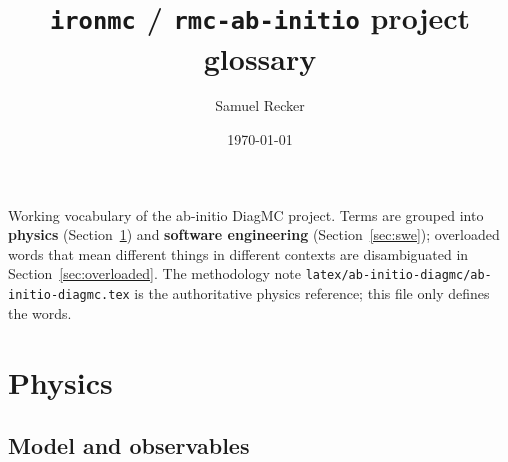 \documentclass[11pt]{article}
\title{\texttt{ironmc} / \texttt{rmc-ab-initio} project glossary}
\author{Samuel Recker}
\date{\today}
\begin{document}
\maketitle

\noindent
Working vocabulary of the ab-initio DiagMC project. Terms are grouped into
\textbf{physics} (Section~\ref{sec:physics}) and \textbf{software engineering}
(Section~\ref{sec:swe}); overloaded words that mean different things in different
contexts are disambiguated in Section~\ref{sec:overloaded}. The methodology note
\texttt{latex/ab-initio-diagmc/ab-initio-diagmc.tex} is the authoritative physics
reference; this file only defines the words.

\section{Physics}
\label{sec:physics}

\subsection{Model and observables}
\end{document}
